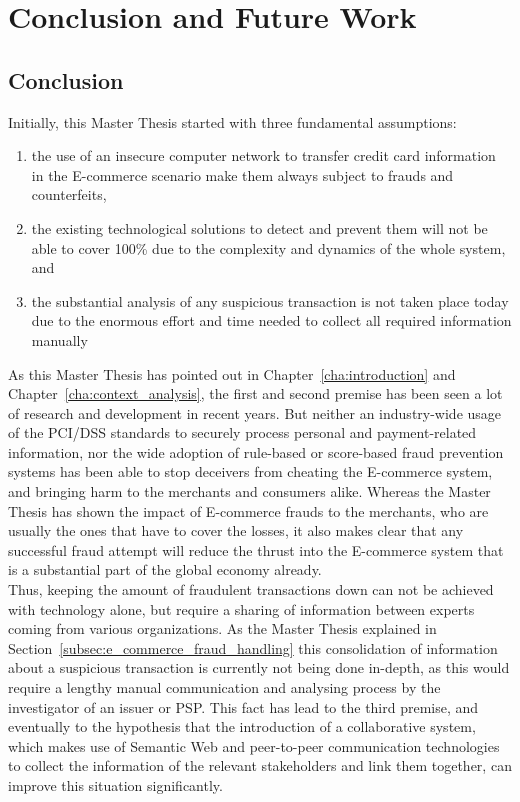 
\chapter{Conclusion and Future Work} %
\label{cha:conclusion}

\section{Conclusion}
\label{sec:conclusion}

Initially, this Master Thesis started with three fundamental assumptions: \@

\begin{enumerate}
	\item the use of an insecure computer network to transfer credit card information in the \gls{E-commerce} scenario make them always subject to frauds and counterfeits,
	\item the existing technological solutions to detect and prevent them will not be able to cover 100\% due to the complexity and dynamics of the whole system, and
	\item the substantial analysis of any suspicious transaction is not taken place today due to the enormous effort and time needed to collect all required information manually
\end{enumerate}

As this Master Thesis has pointed out in Chapter~\ref{cha:introduction} and Chapter~\ref{cha:context_analysis}, the first and second premise has been seen a lot of research and development in recent years. But neither an industry-wide usage of the \gls{PCI/DSS} standards to securely process personal and payment-related information, nor the wide adoption of rule-based or score-based fraud prevention systems has been able to stop deceivers from cheating the \gls{E-commerce} system, and bringing harm to the merchants and consumers alike. Whereas the Master Thesis has shown the impact of \gls{E-commerce} frauds to the merchants, who are usually the ones that have to cover the losses, it also makes clear that any successful fraud attempt will reduce the thrust into the \gls{E-commerce} system that is a substantial part of the global economy already. \\

Thus, keeping the amount of fraudulent transactions down can not be achieved with technology alone, but require a sharing of information between experts coming from various organizations. As the Master Thesis explained in Section~\ref{subsec:e_commerce_fraud_handling} this consolidation of information about a suspicious transaction is currently not being done in-depth, as this would require a lengthy manual communication and analysing process by the investigator of an issuer or \gls{PSP}. This fact has lead to the third premise, and eventually to the hypothesis that the introduction of a collaborative system, which makes use of Semantic Web and peer-to-peer communication technologies to collect the information of the relevant stakeholders and link them together, can improve this situation significantly. \\

